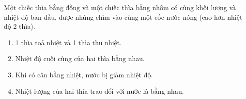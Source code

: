 \begin{ex}
	Một chiếc thìa bằng đồng và một chiếc thìa bằng nhôm có cùng khối lượng và nhiệt độ ban đầu, được nhúng chìm vào cùng một cốc nước nóng (cao hơn nhiệt độ 2 thìa).
	\begin{enumerate}[label=\alph*)]
		\item 1 thìa toả nhiệt và 1 thìa thu nhiệt.
		\item Nhiệt độ cuối cùng của hai thìa bằng nhau.
		\item Khi có cân bằng nhiệt, nước bị giảm nhiệt độ.
		\item Nhiệt lượng của hai thìa trao đổi với nước là bằng nhau.
	\end{enumerate}
	\end{ex}


